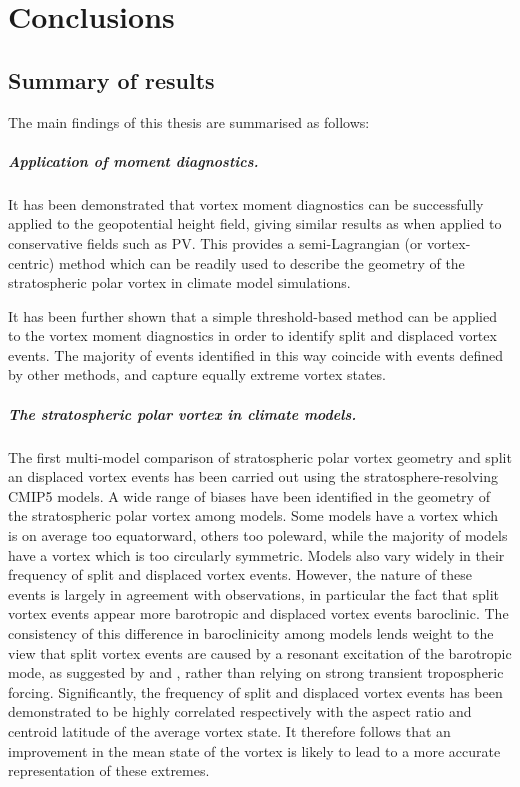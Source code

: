 \chapter{Conclusions}
\label{cha:conclusions}

\section{Summary of results}

The main findings of this thesis are summarised as follows: 

\paragraph{Application of moment diagnostics.} It has been demonstrated that
vortex moment diagnostics can be successfully applied to the geopotential height
field, giving similar results as when applied to conservative fields such as
PV. This provides a semi-Lagrangian (or vortex-centric) method which can be
readily used to describe the geometry of the stratospheric polar vortex in
climate model simulations.

It has been further shown that a simple threshold-based method can be applied to
the vortex moment diagnostics in order to identify split and displaced vortex
events. The majority of events identified in this way coincide with events
defined by other methods, and capture equally extreme vortex states.

\paragraph{The stratospheric polar vortex in climate models.} The first
multi-model comparison of stratospheric polar vortex geometry and split an
displaced vortex events has been carried out using the stratosphere-resolving
CMIP5 models. A wide range of biases have been identified in the geometry of the
stratospheric polar vortex among models. Some models have a vortex which is on
average too equatorward, others too poleward, while the majority of models have
a vortex which is too circularly symmetric. Models also vary widely in their
frequency of split and displaced vortex events. However, the nature of these
events is largely in agreement with observations, in particular the fact that
split vortex events appear more barotropic and displaced vortex events
baroclinic. The consistency of this difference in baroclinicity among models
lends weight to the view that split vortex events are caused by a resonant
excitation of the barotropic mode, as suggested by \citet{Esler2005} and
\citet{Matthewman2011}, rather than relying on strong transient tropospheric
forcing. Significantly, the frequency of split and displaced vortex events has
been demonstrated to be highly correlated respectively with the aspect ratio and
centroid latitude of the average vortex state. It therefore follows that an
improvement in the mean state of the vortex is likely to lead to a more accurate
representation of these extremes.

